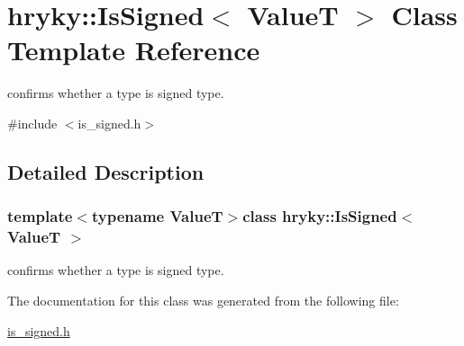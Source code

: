\hypertarget{classhryky_1_1_is_signed}{\section{hryky\-:\-:Is\-Signed$<$ Value\-T $>$ Class Template Reference}
\label{classhryky_1_1_is_signed}
}


confirms whether a type is signed type.  




{\ttfamily \#include $<$is\-\_\-signed.\-h$>$}



\subsection{Detailed Description}
\subsubsection*{template$<$typename Value\-T$>$class hryky\-::\-Is\-Signed$<$ Value\-T $>$}

confirms whether a type is signed type. 

The documentation for this class was generated from the following file\-:\begin{DoxyCompactItemize}
\item 
\hyperlink{is__signed_8h}{is\-\_\-signed.\-h}\end{DoxyCompactItemize}
